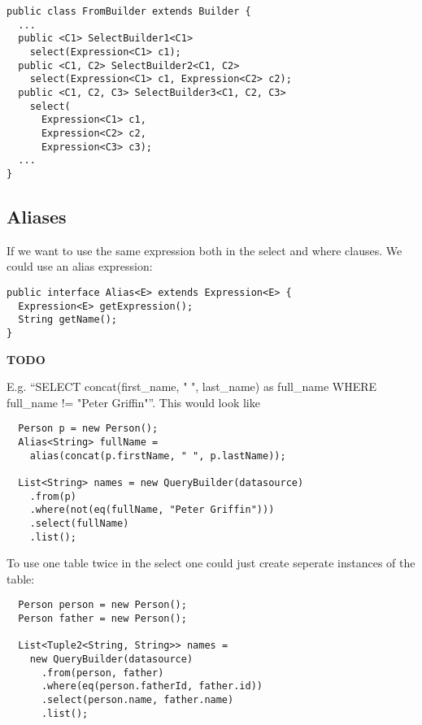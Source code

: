 \documentclass{sig-alternate}
\begin{document}
\begin{verbatim}
public class FromBuilder extends Builder {
  ...
  public <C1> SelectBuilder1<C1> 
    select(Expression<C1> c1);
  public <C1, C2> SelectBuilder2<C1, C2> 
    select(Expression<C1> c1, Expression<C2> c2);
  public <C1, C2, C3> SelectBuilder3<C1, C2, C3> 
    select(
      Expression<C1> c1, 
      Expression<C2> c2, 
      Expression<C3> c3);
  ...
}
\end{verbatim}

\subsection{Aliases}

If we want to use the same expression both in the select and where clauses. We could use an alias expression:

\begin{verbatim}
public interface Alias<E> extends Expression<E> {
  Expression<E> getExpression();
  String getName();
}
\end{verbatim}

\textbf{TODO}

E.g. ``SELECT concat(first\_name, " ", last\_name) as full\_name WHERE
full\_name != "Peter Griffin"''. This would look like

\begin{verbatim}
  Person p = new Person();
  Alias<String> fullName =
    alias(concat(p.firstName, " ", p.lastName));
		
  List<String> names = new QueryBuilder(datasource)
    .from(p)
    .where(not(eq(fullName, "Peter Griffin")))
    .select(fullName)
    .list();
\end{verbatim}

To use one table twice in the select one could just create seperate instances of the table:

\begin{verbatim}
  Person person = new Person();
  Person father = new Person();
		
  List<Tuple2<String, String>> names =
    new QueryBuilder(datasource)
      .from(person, father)
      .where(eq(person.fatherId, father.id))
      .select(person.name, father.name)
      .list();
\end{verbatim}

\end{document}
